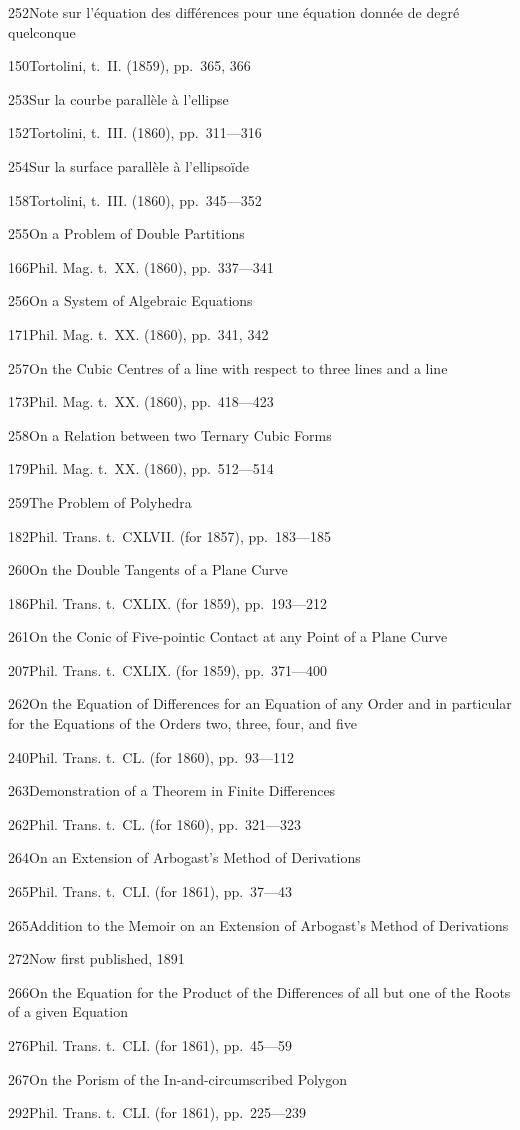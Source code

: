 \documentclass[11pt,a4paper]{book}
\providecommand{\tocentry}[2]{#1\dotfill #2\par}
\begin{document}
\tocentry{252}{Note sur l'\'{e}quation des diff\'{e}rences pour une \'{e}quation donn\'{e}e de degr\'{e} quelconque}{150}{Tortolini, t.~II. (1859), pp.~365, 366}

\tocentry{253}{Sur la courbe parall\`{e}le \`{a} l'ellipse}{152}{Tortolini, t.~III. (1860), pp.~311---316}

\tocentry{254}{Sur la surface parall\`{e}le \`{a} l'ellipso\"{i}de}{158}{Tortolini, t.~III. (1860), pp.~345---352}

\tocentry{255}{On a Problem of Double Partitions}{166}{Phil. Mag. t.~XX. (1860), pp.~337---341}

\tocentry{256}{On a System of Algebraic Equations}{171}{Phil. Mag. t.~XX. (1860), pp.~341, 342}

\tocentry{257}{On the Cubic Centres of a line with respect to three lines and a line}{173}{Phil. Mag. t.~XX. (1860), pp.~418---423}

\tocentry{258}{On a Relation between two Ternary Cubic Forms}{179}{Phil. Mag. t.~XX. (1860), pp.~512---514}

\tocentry{259}{The Problem of Polyhedra}{182}{Phil. Trans. t.~CXLVII. (for 1857), pp.~183---185}

\tocentry{260}{On the Double Tangents of a Plane Curve}{186}{Phil. Trans. t.~CXLIX. (for 1859), pp.~193---212}

\tocentry{261}{On the Conic of Five-pointic Contact at any Point of a Plane Curve}{207}{Phil. Trans. t.~CXLIX. (for 1859), pp.~371---400}

\tocentry{262}{On the Equation of Differences for an Equation of any Order and in particular for the Equations of the Orders two, three, four, and five}{240}{Phil. Trans. t.~CL. (for 1860), pp.~93---112}

\tocentry{263}{Demonstration of a Theorem in Finite Differences}{262}{Phil. Trans. t.~CL. (for 1860), pp.~321---323}

\tocentry{264}{On an Extension of Arbogast's Method of Derivations}{265}{Phil. Trans. t.~CLI. (for 1861), pp.~37---43}

\newpage

\tocentry{265}{Addition to the Memoir on an Extension of Arbogast's Method of Derivations}{272}{Now first published, 1891}

\tocentry{266}{On the Equation for the Product of the Differences of all but one of the Roots of a given Equation}{276}{Phil. Trans. t.~CLI. (for 1861), pp.~45---59}

\tocentry{267}{On the Porism of the In-and-circumscribed Polygon}{292}{Phil. Trans. t.~CLI. (for 1861), pp.~225---239}
\end{document}
